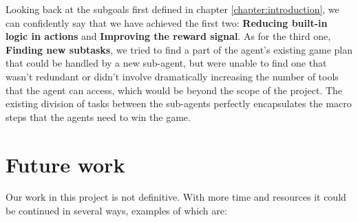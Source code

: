 Looking back at the subgoals first defined in chapter \ref{chapter:introduction}, we can confidently say that we have achieved the first two: \textbf{Reducing built-in logic in actions} and \textbf{Improving the reward signal}. As for the third one, \textbf{Finding new subtasks}, we tried to find a part of the agent's existing game plan that could be handled by a new sub-agent, but were unable to find one that wasn't redundant or didn't involve dramatically increasing the number of tools that the agent can access, which would be beyond the scope of the project. The existing division of tasks between the sub-agents perfectly encapsulates the macro steps that the agents need to win the game.

\section{Future work}

Our work in this project is not definitive. With more time and resources it could be continued in several ways, examples of which are:

